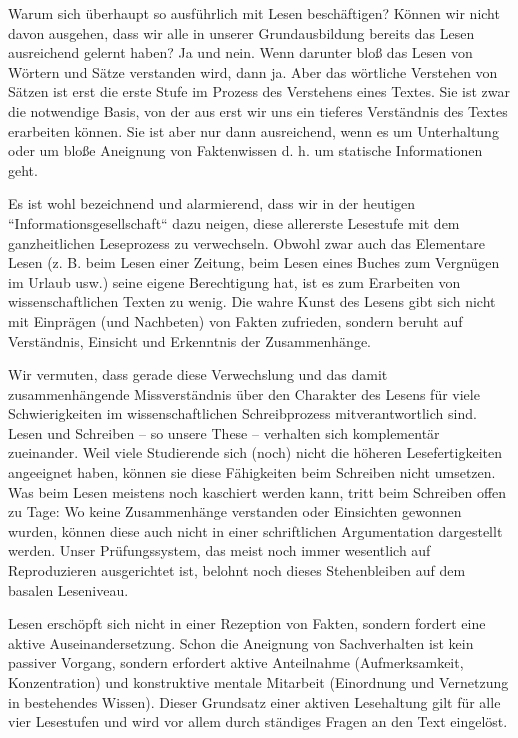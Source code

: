 \documentclass[]{book}
\theoremstyle{definition}
\theoremstyle{definition}
\theoremstyle{definition}
\theoremstyle{remark}
\begin{document}
Warum sich überhaupt so ausführlich mit Lesen beschäftigen? Können wir
nicht davon ausgehen, dass wir alle in unserer Grundausbildung bereits
das Lesen ausreichend gelernt haben? Ja und nein. Wenn darunter bloß das
Lesen von Wörtern und Sätze verstanden wird, dann ja. Aber das wörtliche
Verstehen von Sätzen ist erst die erste Stufe im Prozess des Verstehens
eines Textes. Sie ist zwar die notwendige Basis, von der aus erst wir
uns ein tieferes Verständnis des Textes erarbeiten können. Sie ist aber
nur dann ausreichend, wenn es um Unterhaltung oder um bloße Aneignung
von Faktenwissen d. h. um statische Informationen geht.

Es ist wohl bezeichnend und alarmierend, dass wir in der heutigen
``Informationsgesellschaft`` dazu neigen, diese allererste Lesestufe mit
dem ganzheitlichen Leseprozess zu verwechseln. Obwohl zwar auch das
Elementare Lesen (z. B. beim Lesen einer Zeitung, beim Lesen eines
Buches zum Vergnügen im Urlaub usw.) seine eigene Berechtigung hat, ist
es zum Erarbeiten von wissenschaftlichen Texten zu wenig. Die wahre
Kunst des Lesens gibt sich nicht mit Einprägen (und Nachbeten) von
Fakten zufrieden, sondern beruht auf Verständnis, Einsicht und
Erkenntnis der Zusammenhänge.

Wir vermuten, dass gerade diese Verwechslung und das damit
zusammenhängende Missverständnis über den Charakter des Lesens für viele
Schwierigkeiten im wissenschaftlichen Schreibprozess mitverantwortlich
sind. Lesen und Schreiben -- so unsere These -- verhalten sich
komplementär zueinander. Weil viele Studierende sich (noch) nicht die
höheren Lesefertigkeiten angeeignet haben, können sie diese Fähigkeiten
beim Schreiben nicht umsetzen. Was beim Lesen meistens noch kaschiert
werden kann, tritt beim Schreiben offen zu Tage: Wo keine Zusammenhänge
verstanden oder Einsichten gewonnen wurden, können diese auch nicht in
einer schriftlichen Argumentation dargestellt werden. Unser
Prüfungssystem, das meist noch immer wesentlich auf Reproduzieren
ausgerichtet ist, belohnt noch dieses Stehenbleiben auf dem basalen
Leseniveau.

Lesen erschöpft sich nicht in einer Rezeption von Fakten, sondern
fordert eine aktive Auseinandersetzung. Schon die Aneignung von
Sachverhalten ist kein passiver Vorgang, sondern erfordert aktive
Anteilnahme (Aufmerksamkeit, Konzentration) und konstruktive mentale
Mitarbeit (Einordnung und Vernetzung in bestehendes Wissen). Dieser
Grundsatz einer aktiven Lesehaltung gilt für alle vier Lesestufen und
wird vor allem durch ständiges Fragen an den Text eingelöst.
\end{document}
